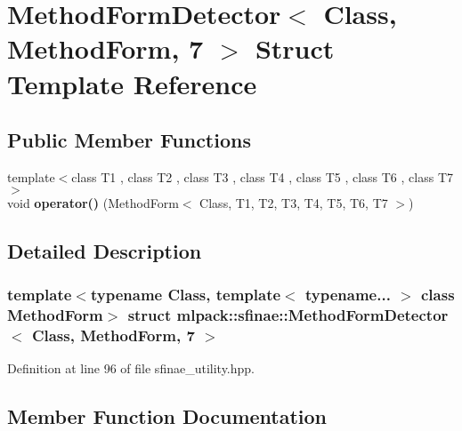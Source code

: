 \section{Method\+Form\+Detector$<$ Class, Method\+Form, 7 $>$ Struct Template Reference}
\label{structmlpack_1_1sfinae_1_1MethodFormDetector_3_01Class_00_01MethodForm_00_017_01_4}
\subsection*{Public Member Functions}
\begin{DoxyCompactItemize}
\item 
{\footnotesize template$<$class T1 , class T2 , class T3 , class T4 , class T5 , class T6 , class T7 $>$ }\\void \textbf{ operator()} (Method\+Form$<$ Class, T1, T2, T3, T4, T5, T6, T7 $>$)
\end{DoxyCompactItemize}


\subsection{Detailed Description}
\subsubsection*{template$<$typename Class, template$<$ typename... $>$ class Method\+Form$>$\newline
struct mlpack\+::sfinae\+::\+Method\+Form\+Detector$<$ Class, Method\+Form, 7 $>$}



Definition at line 96 of file sfinae\+\_\+utility.\+hpp.



\subsection{Member Function Documentation}
\mbox{\label{structmlpack_1_1sfinae_1_1MethodFormDetector_3_01Class_00_01MethodForm_00_017_01_4_aab4f386ae22e4a35fdc71de8cd7c7cbf}} 
